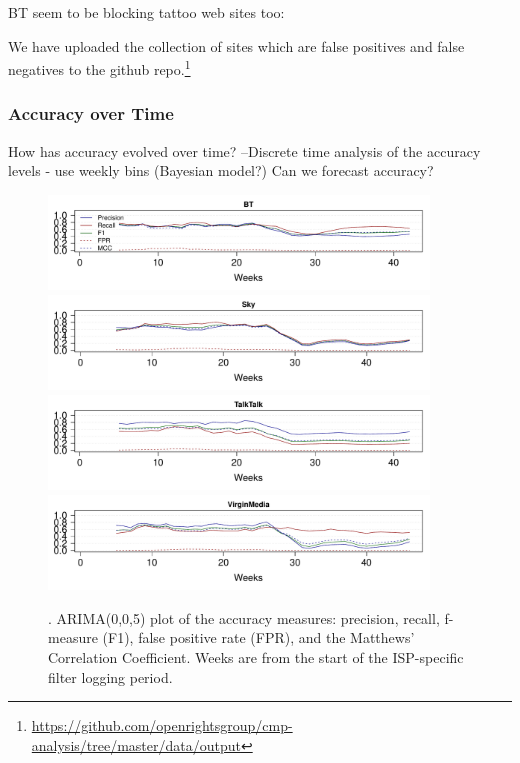 \documentclass{bmcart}
\begin{document}
BT seem to be blocking tattoo web sites too:

We have uploaded the collection of sites which are false positives and false negatives to the github repo.\footnote{\url{https://github.com/openrightsgroup/cmp-analysis/tree/master/data/output}}


\subsubsection*{Accuracy over Time}
How has accuracy evolved over time?
--Discrete time analysis of the accuracy levels - use weekly bins (Bayesian model?) Can we forecast accuracy?


\begin{figure}[h!]
\caption{. ARIMA(0,0,5) plot of the accuracy measures: precision, recall, f-measure (F1), false positive rate (FPR), and the Matthews' Correlation Coefficient. Weeks are from the start of the ISP-specific filter logging period.}
\includegraphics[width=0.9\textwidth]{imgs/BT-ts-accuracy}
\includegraphics[width=0.9\textwidth]{imgs/Sky-ts-accuracy}
\includegraphics[width=0.9\textwidth]{imgs/TalkTalk-ts-accuracy}
\includegraphics[width=0.9\textwidth]{imgs/VirginMedia-ts-accuracy}
\label{fig:broadband-accuracy-ts}
\end{figure}
\end{document}
